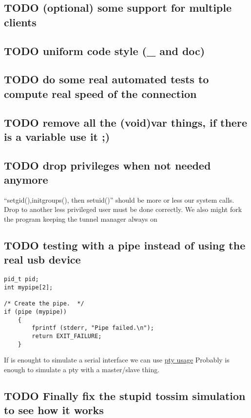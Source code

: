 \documentclass[11pt]{article}
\begin{document}
\subsection{\textbf{TODO} (optional) some support for multiple clients}
\label{sec-1_6}
\subsection{\textbf{TODO} uniform code style (\_{} and doc)}
\label{sec-1_7}
\subsection{\textbf{TODO} do some real automated tests to compute real speed of the connection}
\label{sec-1_8}
\subsection{\textbf{TODO} remove all the (void)var things, if there is a variable use it ;)}
\label{sec-1_9}
\subsection{\textbf{TODO} drop privileges when not needed anymore}
\label{sec-1_10}

   ``setgid(),initgroups(), then setuid()'' should be more or less our system calls.
   Drop to another less privileged user must be done correctly.
   We also might fork the program keeping the tunnel manager always on
\subsection{\textbf{TODO} testing with a pipe instead of using the real usb device}
\label{sec-1_11}

\begin{verbatim}
pid_t pid;
int mypipe[2];

/* Create the pipe.  */
if (pipe (mypipe))
    {
        fprintf (stderr, "Pipe failed.\n");
        return EXIT_FAILURE;
    }
\end{verbatim}
    If is enought to simulate a serial interface we can use  \href{http://www.kernel.org/doc/man-pages/online/pages/man7/pty.7.html}{pty usage}
    Probably is enough to simulate a pty with a master/slave thing.

    
\subsection{\textbf{TODO} Finally fix the stupid tossim simulation to see how it works}
\label{sec-1_12}
\end{document}
